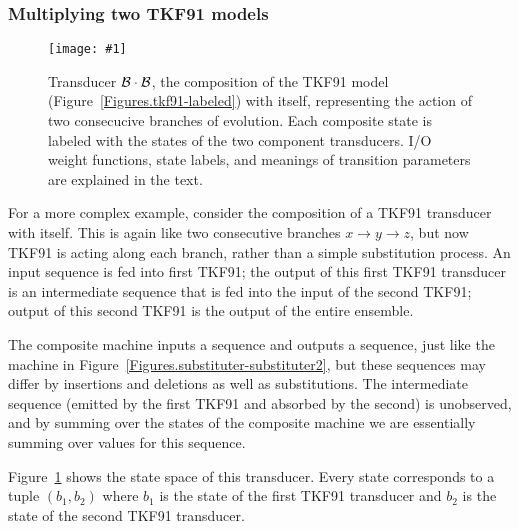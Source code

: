 \documentclass{article}
\newcommand{\figref}[1]{Figure~\ref{Figures.#1}}
\newcommand{\figlabel}[1]{\label{Figures.#1}}
\newcommand{\easyfig}[4]{
\begin{figure}
\texttt{[image: \#1]}
\caption{ \figlabel{#3} #4}
\end{figure}}
\newcommand{\widepdffig}[2]{\easyfig{#1-fig.pdf}{width=\textwidth}{#1}{#2}}
\newcommand\tkf{{\cal B}}
\begin{document}
\subsubsection{Multiplying two TKF91 models}

\widepdffig{tkf91-tkf91}{Transducer $\tkf \cdot \tkf$, the composition of the 
TKF91 model (\figref{tkf91-labeled}) with itself, representing the action of
 two consecucive branches of evolution.
Each composite state is labeled with the states of the two component transducers.  
I/O weight functions, state labels, and meanings of transition parameters are explained in the text. 
}

For a more complex example, consider the composition of a TKF91 transducer with itself.  
This is again like two consecutive branches $x \to y \to z$, 
but now TKF91 is acting along each branch, rather than a simple substitution process. 
An input sequence is fed into first TKF91; 
the output of this first TKF91 transducer is an intermediate sequence
 that is fed into the input of the second TKF91;
output of this second TKF91 is the output of the entire ensemble.

The composite machine inputs a sequence and outputs a sequence, just like the machine
in  \figref{substituter-substituter2}, but these sequences may differ by insertions and deletions
as well as substitutions. 
The intermediate sequence (emitted by the first TKF91 and absorbed by the second) is unobserved,
and by summing over the states of the composite machine we are essentially summing over
values for this sequence. 

\figref{tkf91-tkf91} shows the state space of this transducer.  
Every state corresponds to a tuple $(b_1,b_2)$
where
$b_1$ is the state of the first TKF91 transducer and
$b_2$ is the state of the second TKF91 transducer.
\end{document}
